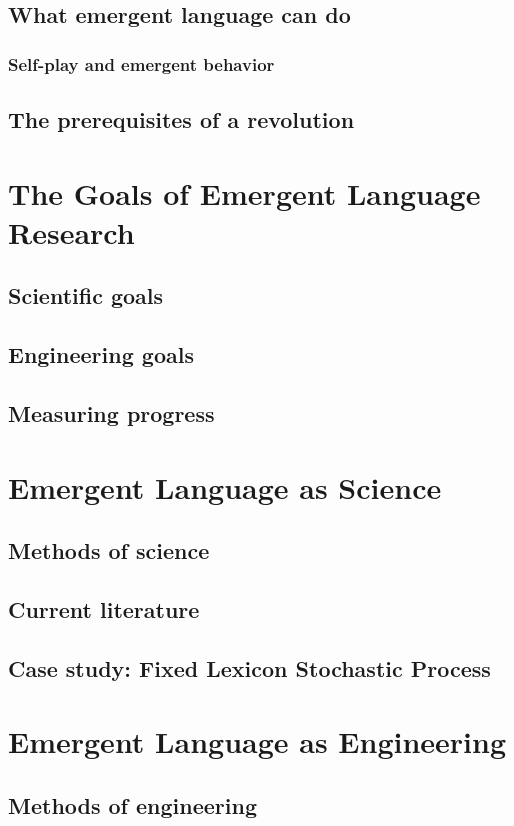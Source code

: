 \documentclass[letterpaper]{report}
\begin{document}
\section{What emergent language can do}
\subsection{Self-play and emergent behavior}
\section{The prerequisites of a revolution}

\chapter{The Goals of Emergent Language Research}
\section{Scientific goals}
\section{Engineering goals}
\section{Measuring progress}

\chapter{Emergent Language as Science}
\section{Methods of science}
\section{Current literature}
\section{Case study: Fixed Lexicon Stochastic Process}

\chapter{Emergent Language as Engineering}
\section{Methods of engineering}
\end{document}
